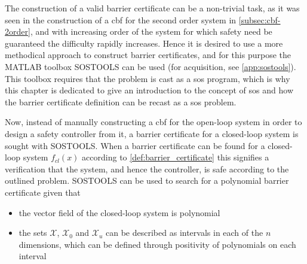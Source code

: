 The construction of a valid barrier certificate can be a non-trivial task, as it was seen in the construction of a \gls{cbf} for the second order system in \autoref{subsec:cbf-2order}, and with increasing order of the system for which safety need be guaranteed the difficulty rapidly increases. Hence it is desired to use a more methodical approach to construct barrier certificates, and for this purpose the MATLAB toolbox SOSTOOLS can be used \citep{bib:prajna_framework} (for acquisition, see \autoref{app:sostools}). This toolbox requires that the problem is cast as a \gls{sos} program, which is why this chapter is dedicated to give an introduction to the concept of \gls{sos} and how the barrier certificate definition can be recast as a \gls{sos} problem.

Now, instead of manually constructing a \gls{cbf} for the open-loop system in order to design a safety controller from it, a barrier certificate for a closed-loop system is sought with SOSTOOLS.
When a barrier certificate can be found for a closed-loop system $f_{cl}(x)$ according to \autoref{def:barrier_certificate} this signifies a verification that the system, and hence the controller, is safe according to the outlined problem. 
SOSTOOLS can be used to search for a polynomial barrier certificate given that \citep{bib:prajna_framework}
\vspace{-2mm}
\begin{itemize}
	\itemsep-0.5mm
\item the vector field of the closed-loop system is polynomial
\item the sets $\mathcal{X}$, $\mathcal{X}_0$ and $\mathcal{X}_u$ can be described as intervals in each of the $n$ dimensions, which can be defined through positivity of polynomials on each interval
\end{itemize}

